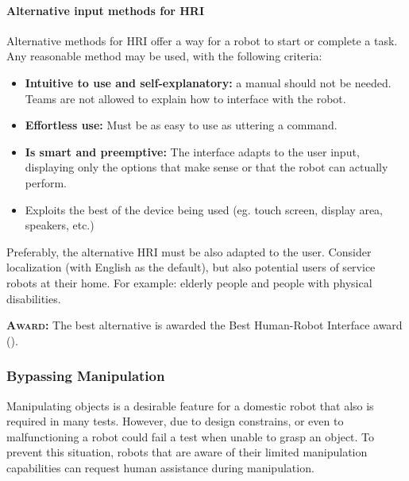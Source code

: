 \paragraph{Alternative input methods for HRI}
\label{rule:asralternative}
Alternative methods for HRI offer a way for a robot to start or complete a task. Any reasonable method may be used, with the following criteria:
\begin{itemize}
	\item \textbf{Intuitive to use and self-explanatory:} a manual should not be needed. Teams are not allowed to explain how to interface with the robot. %

	\item \textbf{Effortless use:} Must be as easy to use as uttering a command. %

	\item \textbf{Is smart and preemptive:} The interface adapts to the user input, displaying only the options that make sense or that the robot can actually perform.

	\item Exploits the best of the device being used (eg. touch screen, display area, speakers, etc.)
\end{itemize}

Preferably, the alternative HRI must be also adapted to the user. Consider localization (with English as the default), but also potential users of service robots at their home. For example: elderly people and people with physical disabilities.

\textbf{\textsc{Award:}} The best alternative is awarded the Best Human-Robot Interface award ().



\subsubsection{Bypassing Manipulation}
\label{rule:mancontinue}
Manipulating objects is a desirable feature for a domestic robot that also is required in many tests. However, due to design constrains, or even to malfunctioning a robot could fail a test when unable to grasp an object. To prevent this situation, robots that are aware of their limited manipulation capabilities can request human assistance during manipulation.

